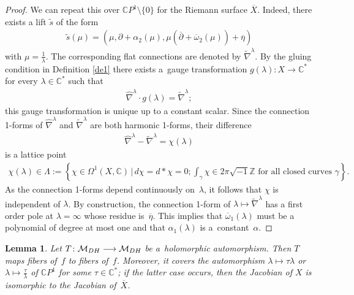 \documentclass[11pt]{article}
\numberwithin{equation}{section}
\newtheorem{Lemma}[Theorem]{Lemma}
\begin{document}
\begin{proof}
We can repeat this over $\mathbb CP^1\setminus\{0\}$ for the Riemann surface $\overline X$. Indeed, there exists a lift $\widetilde s$ of the form
\begin{gather*}\widetilde{s}(\mu) = (\mu,\partial +\alpha_2(\mu), \mu(\overline{\partial}+ \overline{\omega}_2(\mu))+\overline{\eta})\end{gather*}
with $\mu = \frac{1}{\lambda}$. The corresponding f\/lat connections are denoted by $\widetilde{\nabla}^\lambda$. By the gluing condition in Def\/inition \ref{de1} there exists a~gauge transformation $g(\lambda) \colon X \longrightarrow \mathbb C^*$ for every $\lambda \in \mathbb C^*$ such that \begin{gather*}\widehat{\nabla}^\lambda\cdot g(\lambda) = \widetilde{\nabla}^\lambda ;\end{gather*}
this gauge transformation is unique up to a constant scalar. Since the connection 1-forms of $\widehat{\nabla}^\lambda$ and $\widetilde{\nabla}^\lambda$ are both harmonic 1-forms, their dif\/ference
\begin{gather*}\widehat{\nabla}^\lambda-\widetilde{\nabla}^\lambda = \chi(\lambda)\end{gather*}
is a lattice point
\begin{gather}\label{Gamma}
\chi(\lambda) \in \Lambda := \left\{\!\chi \in \Omega^1(X, \mathbb C) \,|\, d\chi = d*\chi = 0;
\int_\gamma\chi\in2\pi\sqrt{-1}\mathbb Z \text{ for all closed curves } \gamma\!\right\}\!.\!\!\!\!\end{gather}
As the connection 1-forms depend continuously on~$\lambda$, it follows that $\chi$ is independent of $\lambda$. By construction, the connection 1-form of $\lambda \longmapsto \widetilde{\nabla}^\lambda$ has a f\/irst order pole at $\lambda = \infty$ whose residue is~$\overline{\eta}$.
This implies that $\overline{\omega}_1(\lambda)$ must be a polynomial of degree at most one and that $\alpha_1(\lambda)$ is a~constant~$\alpha$.
\end{proof}

\begin{Lemma}\label{tau-lemma} Let $T \colon {\mathcal M}_{\rm DH} \longrightarrow {\mathcal M}_{\rm DH}$ be a~holomorphic automorphism. Then $T$ maps fibers of~$f$ to fibers of~$f$. Moreover, it covers the automorphism $\lambda \longmapsto \tau\lambda$ or $\lambda \longmapsto \frac{\tau}{\lambda}$ of ${\mathbb C}P^1$ for some $\tau \in \mathbb C^*$; if the latter case occurs, then the Jacobian of $X$ is isomorphic to the Jacobian of~$\overline X$.
\end{Lemma}
\end{document}
